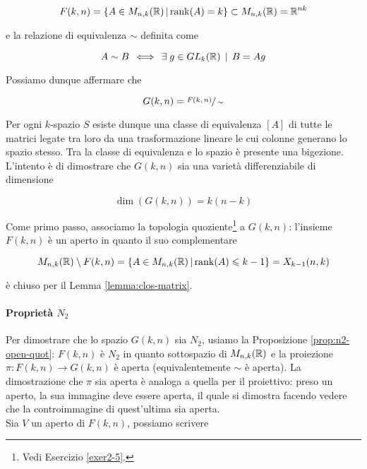 \begin{equation}
	F(k,n) = \left\{ A \in M_{n,k}(\mathbb{R}) \, \middle| \, \rank(A) = k \right\} \subset M_{n,k}(\mathbb{R}) = \mathbb{R}^{nk}
\end{equation}

e la relazione di equivalenza $ \sim $ definita come

\begin{equation}
	A \sim B \, \iff \, \exists \; g \in GL_{k}(\mathbb{R}) \, \mid \, B = A g
\end{equation}

Possiamo dunque affermare che

\begin{equation}
	G(k,n) = \sfrac{F(k,n)}{\sim}
\end{equation}

Per ogni $ k $-spazio $ S $ esiste dunque una classe di equivalenza $ [A] $ di tutte le matrici legate tra loro da una trasformazione lineare le cui colonne generano lo spazio stesso. Tra la classe di equivalenza e lo spazio è presente una bigezione. \\
L'intento è di dimostrare che $ G(k,n) $ sia una varietà differenziabile di dimensione

\begin{equation}
	\dim (G(k,n)) = k (n-k)
\end{equation}

Come primo passo, associamo la topologia quoziente\footnote{%
	Vedi Esercizio \ref{exer2-5}.%
} a $ G(k,n) $: l'insieme $ F(k,n) $ è un aperto in quanto il suo complementare

\begin{equation}
	M_{n,k}(\mathbb{R}) \setminus F(k,n) = \left\{ A \in M_{n,k}(\mathbb{R}) \, \middle| \, \rank(A) \leqslant k - 1 \right\} = X_{k-1} (n,k)
\end{equation}

è chiuso per il Lemma \ref{lemma:clos-matrix}.

\paragraph{Proprietà $ N_{2} $}

Per dimostrare che lo spazio $ G(k,n) $ sia $ N_{2} $, usiamo la Proposizione \ref{prop:n2-open-quot}: $ F(k,n) $ è $ N_{2} $ in quanto sottospazio di $ M_{n,k}(\mathbb{R}) $ e la proiezione $ \pi : F(k,n) \to G(k,n) $ è aperta (equivalentemente $ \sim $ è aperta).
La dimostrazione che $ \pi $ sia aperta è analoga a quella per il proiettivo: preso un aperto, la sua immagine deve essere aperta, il quale si dimostra facendo vedere che la controimmagine di quest'ultima sia aperta. \\
Sia $ V $ un aperto di $ F(k,n) $, possiamo scrivere

